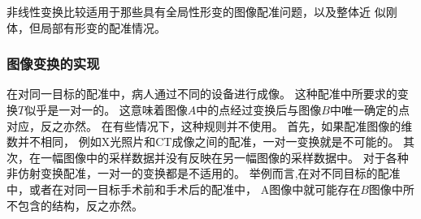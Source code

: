 非线性变换比较适用于那些具有全局性形变的图像配准问题，以及整体近
似刚体，但局部有形变的配准情况。

\subsubsection{图像变换的实现}
在对同一目标的配准中，病人通过不同的设备进行成像。
这种配准中所要求的变换$T$似乎是一对一的。
这意味着图像$A$中的点经过变换后与图像$B$中唯一确定的点对应，反之亦然。
在有些情况下，这种规则并不使用。
首先，如果配准图像的维数并不相同，
例如X光照片和CT成像之间的配准，一对一变换就是不可能的。
其次，在一幅图像中的采样数据并没有反映在另一幅图像的采样数据中。
对于各种非仿射变换配准，一对一的变换都是不适用的。
举例而言,在对不同目标的配准中，或者在对同一目标手术前和手术后的配准中，
A图像中就可能存在$B$图像中所不包含的结构，反之亦然。

